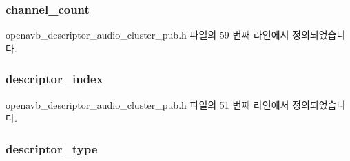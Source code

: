 \subsubsection[{\texorpdfstring{channel\+\_\+count}{channel_count}}]{ channel\+\_\+count}\hypertarget{structopenavb__aem__descriptor__audio__cluster__t_a359a7395e4b3122969ec0ae646d366b5}{}\label{structopenavb__aem__descriptor__audio__cluster__t_a359a7395e4b3122969ec0ae646d366b5}


openavb\+\_\+descriptor\+\_\+audio\+\_\+cluster\+\_\+pub.\+h 파일의 59 번째 라인에서 정의되었습니다.

\subsubsection[{\texorpdfstring{descriptor\+\_\+index}{descriptor_index}}]{ descriptor\+\_\+index}\hypertarget{structopenavb__aem__descriptor__audio__cluster__t_ab26fb363c24b9a2a4391f9171c981b08}{}\label{structopenavb__aem__descriptor__audio__cluster__t_ab26fb363c24b9a2a4391f9171c981b08}


openavb\+\_\+descriptor\+\_\+audio\+\_\+cluster\+\_\+pub.\+h 파일의 51 번째 라인에서 정의되었습니다.

\subsubsection[{\texorpdfstring{descriptor\+\_\+type}{descriptor_type}}]{ descriptor\+\_\+type}\hypertarget{structopenavb__aem__descriptor__audio__cluster__t_a1e231d7874aada5925b29affc76782cc}{}\label{structopenavb__aem__descriptor__audio__cluster__t_a1e231d7874aada5925b29affc76782cc}


